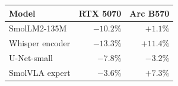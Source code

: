 \begin{tabular}{@{}lrr@{}}
\toprule
Model & RTX 5070 & Arc B570 \\
\midrule
SmolLM2-135M & $-10.2\%$ & $+1.1\%$ \\
Whisper encoder & $-13.3\%$ & $+11.4\%$ \\
U-Net-small & $-7.8\%$ & $-3.2\%$ \\
SmolVLA expert & $-3.6\%$ & $+7.3\%$ \\
\bottomrule
\end{tabular}
